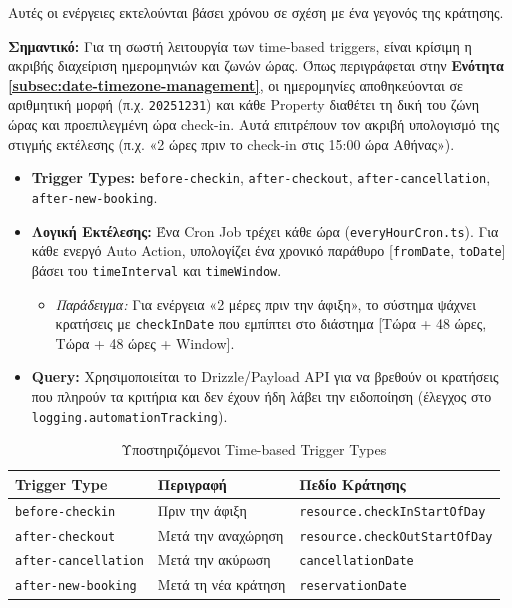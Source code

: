 \documentclass[
	12pt, %
	oneside, %
	greek,
	onehalfspacing, %
	liststotoc, %
	toctotoc, %
	parskip, %
	headsepline, %
]{MastersDoctoralThesis} %
\newcommand{\code}[1]{\texttt{#1}}
\begin{document}
Αυτές οι ενέργειες εκτελούνται βάσει χρόνου σε σχέση με ένα γεγονός της κράτησης.

\textbf{Σημαντικό:} Για τη σωστή λειτουργία των time-based triggers, είναι κρίσιμη η ακριβής διαχείριση ημερομηνιών και ζωνών ώρας. Όπως περιγράφεται στην \textbf{Ενότητα \ref{subsec:date-timezone-management}}, οι ημερομηνίες αποθηκεύονται σε αριθμητική μορφή (π.χ. \code{20251231}) και κάθε Property διαθέτει τη δική του ζώνη ώρας και προεπιλεγμένη ώρα check-in. Αυτά επιτρέπουν τον ακριβή υπολογισμό της στιγμής εκτέλεσης (π.χ. «2 ώρες πριν το check-in στις 15:00 ώρα Αθήνας»).

\begin{itemize}
    \item \textbf{Trigger Types:} \code{before-checkin}, \code{after-checkout}, \code{after-cancellation}, \code{after-new-booking}.
    \item \textbf{Λογική Εκτέλεσης:} Ένα Cron Job τρέχει κάθε ώρα (\code{everyHourCron.ts}). Για κάθε ενεργό Auto Action, υπολογίζει ένα χρονικό παράθυρο [\code{fromDate}, \code{toDate}] βάσει του \code{timeInterval} και \code{timeWindow}.
    \begin{itemize}
        \item \textit{Παράδειγμα:} Για ενέργεια «2 μέρες πριν την άφιξη», το σύστημα ψάχνει κρατήσεις με \code{checkInDate} που εμπίπτει στο διάστημα [Τώρα + 48 ώρες, Τώρα + 48 ώρες + Window].
    \end{itemize}
    \item \textbf{Query:} Χρησιμοποιείται το Drizzle/Payload API για να βρεθούν οι κρατήσεις που πληρούν τα κριτήρια και δεν έχουν ήδη λάβει την ειδοποίηση (έλεγχος στο \code{logging.automationTracking}).
\end{itemize}

\begin{table}[H]
\centering
\caption{Υποστηριζόμενοι Time-based Trigger Types}
\label{tab:trigger-types}
\begin{tabular}{@{}lll@{}}
\toprule
\textbf{Trigger Type} & \textbf{Περιγραφή} & \textbf{Πεδίο Κράτησης} \\
\midrule
\code{before-checkin} & Πριν την άφιξη & \code{resource.checkInStartOfDay} \\
\code{after-checkout} & Μετά την αναχώρηση & \code{resource.checkOutStartOfDay} \\
\code{after-cancellation} & Μετά την ακύρωση & \code{cancellationDate} \\
\code{after-new-booking} & Μετά τη νέα κράτηση & \code{reservationDate} \\
\bottomrule
\end{tabular}
\end{table}
\end{document}

